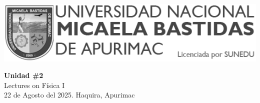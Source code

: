 

\begin{minipage}[l]{0.42\textwidth}
    \includegraphics[width=1\textwidth]{img/logo-UNAMBA.png}
\end{minipage}
\hfill
\begin{minipage}[c]{0.5\textwidth}
    \begin{flushright}
	\large{\textbf{Unidad \#2}}\\
	\large{Lectures on Física I}\\
	\large{22 de Agosto del 2025. Haquira, Apurimac}\\
    \end{flushright}
\end{minipage}


  
